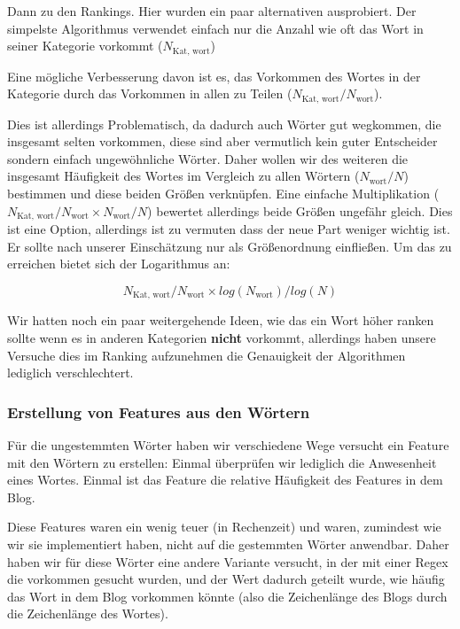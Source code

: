 \documentclass[
	11pt,
	a4paper
]{scrartcl}
\begin{document}
Dann zu den Rankings. Hier wurden ein paar alternativen ausprobiert. 
Der simpelste Algorithmus verwendet einfach nur die Anzahl wie oft das Wort in seiner Kategorie vorkommt ($N_{\text{Kat, wort}}$)

Eine mögliche Verbesserung davon ist es, das Vorkommen des Wortes in der Kategorie durch das Vorkommen in allen zu Teilen ($N_{\text{Kat, wort}} / N_{\text{wort}}$). 

Dies ist allerdings Problematisch, da dadurch auch Wörter gut wegkommen, die insgesamt selten vorkommen, diese sind aber vermutlich kein guter Entscheider sondern einfach ungewöhnliche Wörter.
Daher wollen wir des weiteren die insgesamt Häufigkeit des Wortes im Vergleich zu allen Wörtern ($N_{\text{wort}} / N$) bestimmen und diese beiden Größen verknüpfen.
Eine einfache Multiplikation ($N_{\text{Kat, wort}} / N_{\text{wort}} \times N_{\text{wort}} / N$)
bewertet allerdings beide Größen ungefähr gleich. 
Dies ist eine Option, allerdings ist zu vermuten dass der neue Part weniger wichtig ist. 
Er sollte nach unserer Einschätzung nur als Größenordnung einfließen. 
Um das zu erreichen bietet sich der Logarithmus an:

\begin{equation} \label{eq-log}
	N_{\text{Kat, wort}} / N_{\text{wort}} \times log(N_{\text{wort}}) / log(N)
\end{equation}

Wir hatten noch ein paar weitergehende Ideen, wie das ein Wort höher ranken sollte wenn es in anderen Kategorien \textbf{nicht} vorkommt, 
allerdings haben unsere Versuche dies im Ranking aufzunehmen die Genauigkeit der Algorithmen lediglich verschlechtert.

\subsubsection{Erstellung von Features aus den Wörtern}

Für die ungestemmten Wörter haben wir verschiedene Wege versucht ein Feature mit den Wörtern zu erstellen:
Einmal überprüfen wir lediglich die Anwesenheit eines Wortes.
Einmal ist das Feature die relative Häufigkeit des Features in dem Blog.

Diese Features waren ein wenig teuer (in Rechenzeit) und waren, zumindest wie wir sie implementiert haben, nicht auf die gestemmten Wörter anwendbar.
Daher haben wir für diese Wörter eine andere Variante versucht, in der mit einer Regex die vorkommen gesucht wurden, 
und der Wert dadurch geteilt wurde, wie häufig das Wort in dem Blog vorkommen könnte (also die Zeichenlänge des Blogs durch die Zeichenlänge des Wortes).
\end{document}
